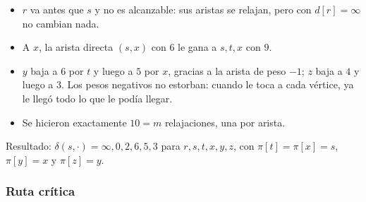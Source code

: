 \documentclass[11pt,letterpaper]{article}
\begin{document}
\begin{ejemplo}
\begin{center}
  \end{center}
  \begin{itemize}[itemsep=0.1em]
    \item $r$ va antes que $s$ y no es alcanzable: sus aristas se
          relajan, pero con $d[r] = \infty$ no cambian nada.
    \item A $x$, la arista directa $(s, x)$ con $6$ le gana a
          $s, t, x$ con $9$.
    \item $y$ baja a $6$ por $t$ y luego a $5$ por $x$, gracias a la
          arista de peso $-1$; $z$ baja a $4$ y luego a $3$. Los pesos
          negativos no estorban: cuando le toca a cada vértice, ya le
          llegó todo lo que le podía llegar.
    \item Se hicieron exactamente $10 = m$ relajaciones, una por
          arista.
  \end{itemize}
  Resultado: $\delta(s, \cdot) = \infty, 0, 2, 6, 5, 3$ para
  $r, s, t, x, y, z$, con $\pi[t] = \pi[x] = s$, $\pi[y] = x$ y
  $\pi[z] = y$.
\end{ejemplo}

\subsubsection*{Ruta crítica}
\end{document}
